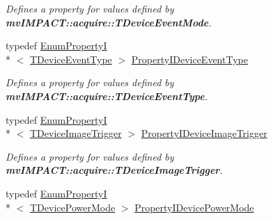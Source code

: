 \begin{DoxyCompactItemize}
\begin{DoxyCompactList}\small\item\em Defines a property for values defined by {\bfseries mv\+I\+M\+P\+A\+C\+T\+::acquire\+::\+T\+Device\+Event\+Mode}. \end{DoxyCompactList}\item 
\hypertarget{group___device_specific_interface_ga015a49062ba10316202f202c53d32993}{typedef \hyperlink{classmv_i_m_p_a_c_t_1_1acquire_1_1_enum_property_i}{Enum\+Property\+I}\\*
$<$ \hyperlink{group___common_interface_ga0947eb7d6a73b9baab283cbf65cd8d6b}{T\+Device\+Event\+Type} $>$ \hyperlink{group___device_specific_interface_ga015a49062ba10316202f202c53d32993}{Property\+I\+Device\+Event\+Type}}\label{group___device_specific_interface_ga015a49062ba10316202f202c53d32993}

\begin{DoxyCompactList}\small\item\em Defines a property for values defined by {\bfseries mv\+I\+M\+P\+A\+C\+T\+::acquire\+::\+T\+Device\+Event\+Type}. \end{DoxyCompactList}\item 
\hypertarget{group___device_specific_interface_ga0a157bd269e0e43d0d944d3f9615f770}{typedef \hyperlink{classmv_i_m_p_a_c_t_1_1acquire_1_1_enum_property_i}{Enum\+Property\+I}\\*
$<$ \hyperlink{group___device_specific_interface_ga84cf0914a0520d38dac38d96d5bc9754}{T\+Device\+Image\+Trigger} $>$ \hyperlink{group___device_specific_interface_ga0a157bd269e0e43d0d944d3f9615f770}{Property\+I\+Device\+Image\+Trigger}}\label{group___device_specific_interface_ga0a157bd269e0e43d0d944d3f9615f770}

\begin{DoxyCompactList}\small\item\em Defines a property for values defined by {\bfseries mv\+I\+M\+P\+A\+C\+T\+::acquire\+::\+T\+Device\+Image\+Trigger}. \end{DoxyCompactList}\item 
\hypertarget{group___device_specific_interface_ga82621bec575e1885ef8589f5ebfdc43d}{typedef \hyperlink{classmv_i_m_p_a_c_t_1_1acquire_1_1_enum_property_i}{Enum\+Property\+I}\\*
$<$ \hyperlink{group___device_specific_interface_ga49794dba4ca888981afe17cdb43d427d}{T\+Device\+Power\+Mode} $>$ \hyperlink{group___device_specific_interface_ga82621bec575e1885ef8589f5ebfdc43d}{Property\+I\+Device\+Power\+Mode}}\label{group___device_specific_interface_ga82621bec575e1885ef8589f5ebfdc43d}


\end{DoxyCompactItemize}
